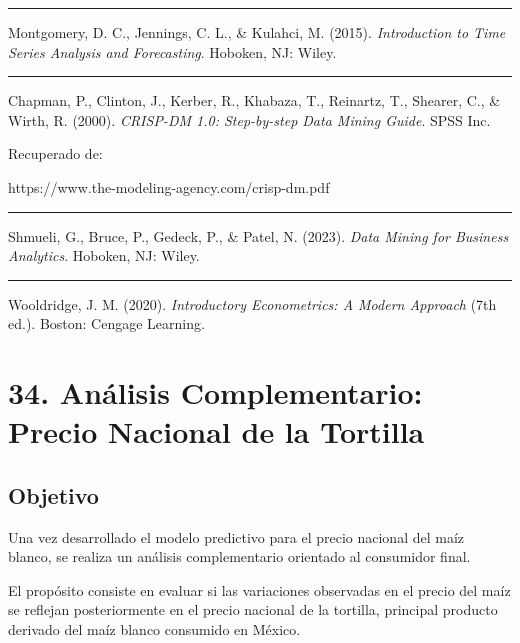 \documentclass[11pt]{article}
\begin{document}
\begin{center}\rule{0.5\linewidth}{0.5pt}\end{center}

Montgomery, D. C., Jennings, C. L., \& Kulahci, M. (2015).
\emph{Introduction to Time Series Analysis and Forecasting}. Hoboken,
NJ: Wiley.

\begin{center}\rule{0.5\linewidth}{0.5pt}\end{center}

Chapman, P., Clinton, J., Kerber, R., Khabaza, T., Reinartz, T.,
Shearer, C., \& Wirth, R. (2000). \emph{CRISP-DM 1.0: Step-by-step Data
Mining Guide}. SPSS Inc.

Recuperado de:

https://www.the-modeling-agency.com/crisp-dm.pdf

\begin{center}\rule{0.5\linewidth}{0.5pt}\end{center}

Shmueli, G., Bruce, P., Gedeck, P., \& Patel, N. (2023). \emph{Data
Mining for Business Analytics}. Hoboken, NJ: Wiley.

\begin{center}\rule{0.5\linewidth}{0.5pt}\end{center}

Wooldridge, J. M. (2020). \emph{Introductory Econometrics: A Modern
Approach} (7th ed.). Boston: Cengage Learning.

    \hypertarget{anuxe1lisis-complementario-precio-nacional-de-la-tortilla}{%
\section{34. Análisis Complementario: Precio Nacional de la
Tortilla}\label{anuxe1lisis-complementario-precio-nacional-de-la-tortilla}}

\hypertarget{objetivo}{%
\subsection{Objetivo}\label{objetivo}}

Una vez desarrollado el modelo predictivo para el precio nacional del
maíz blanco, se realiza un análisis complementario orientado al
consumidor final.

El propósito consiste en evaluar si las variaciones observadas en el
precio del maíz se reflejan posteriormente en el precio nacional de la
tortilla, principal producto derivado del maíz blanco consumido en
México.
\end{document}
